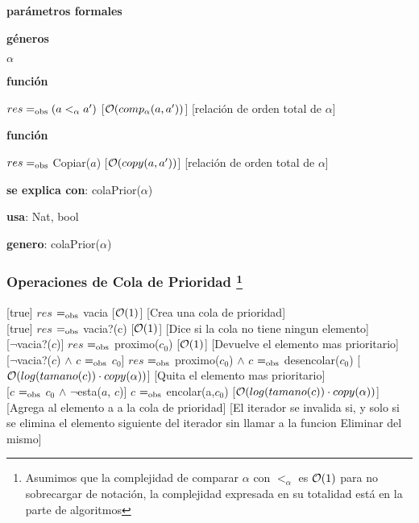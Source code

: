 \begin{Interfaz}
		\textbf{parámetros formales}\parindent\\
 	  \parbox{1.7cm}{\textbf{géneros}} $\alpha$\\	  
	  \parbox[t]{1.7cm}{\textbf{función}}\parbox[t]{\textwidth-2\parindent-1.7cm}{    	
    {$res =_{\mathrm{obs}} (a <_{\alpha} a')$}
    [$\mathcal{O}(comp_{\alpha}(a, a'))$]
    [relación de orden total de $\alpha$]
    }
    
    	\parbox[t]{1.7cm}{\textbf{función}}\parbox[t]{\textwidth-2\parindent-1.7cm}{    	
    {$res =_{\mathrm{obs}}$ Copiar($a$)}
    [$\mathcal{O}(copy(a, a'))$]
    [relación de orden total de $\alpha$]
    }

  \textbf{se explica con}: colaPrior($\alpha$)

  \textbf{usa}: Nat, bool
  
  \textbf{genero}: colaPrior($\alpha$)


  \subsubsection*{Operaciones de Cola de Prioridad \footnote{Asumimos que la complejidad de comparar $\alpha$ con $<_\alpha$ es $\mathcal{O}(1)$ para no sobrecargar de notación, la complejidad expresada en su totalidad está en la parte de algoritmos}}

  [true]
  {$res$ $=_{\mathrm{obs}}$ vacia}
  [$\mathcal{O}(1)$]
  [Crea una cola de prioridad]\\ 
  
  [true]
  {$res$ $=_{\mathrm{obs}}$ vacia?(c)}
  [$\mathcal{O}(1)$]
  [Dice si la cola no tiene ningun elemento]\\ 

  [$\neg$vacia?($c$)]
  {$res$ $=_{\mathrm{obs}}$ proximo($c_0$)}
  [$\mathcal{O}(1)$]
  [Devuelve el elemento mas prioritario]\\   
  
  [$\neg$vacia?($c$) $\land$ $c$ $=_{\mathrm{obs}}$ $c_0$]
  {$res$ $=_{\mathrm{obs}}$ proximo($c_0$) $\land$ $c$ $=_{\mathrm{obs}}$ desencolar($c_0$)}
  [$\mathcal{O}(log(tamano(c)) \cdot copy(\alpha))$]
  [Quita el elemento mas prioritario]\\   
  
	\newpage  
  [$c$ $=_{\mathrm{obs}}$ $c_0$ $\land$ $\neg$esta($a$, $c$)] %
  {$c$ $=_{\mathrm{obs}}$ encolar(a,$c_0$)}
  [$\mathcal{O}(log(tamano(c)) \cdot copy(\alpha))$]
  [Agrega al elemento a a la cola de prioridad]
  [El iterador se invalida si, y solo si se elimina el elemento siguiente del iterador sin llamar a la funcion Eliminar del mismo]\\ 

\end{Interfaz}


